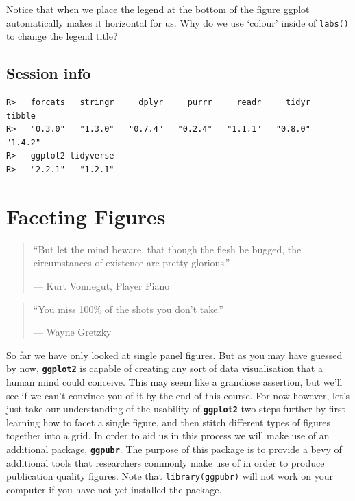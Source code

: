 \documentclass[]{book}
\newenvironment{Shaded}{\begin{snugshade}}{\end{snugshade}}
\newcommand{\KeywordTok}[1]{\textcolor[rgb]{0.13,0.29,0.53}{\textbf{#1}}}
\newcommand{\StringTok}[1]{\textcolor[rgb]{0.31,0.60,0.02}{#1}}
\newcommand{\OperatorTok}[1]{\textcolor[rgb]{0.81,0.36,0.00}{\textbf{#1}}}
\newcommand{\NormalTok}[1]{#1}
\theoremstyle{definition}
\theoremstyle{definition}
\theoremstyle{definition}
\theoremstyle{remark}
\begin{document}
Notice that when we place the legend at the bottom of the figure ggplot
automatically makes it horizontal for us. Why do we use `colour' inside
of \texttt{labs()} to change the legend title?

\section{Session info}\label{session-info-3}

\begin{Shaded}
\end{Shaded}

\begin{verbatim}
R>   forcats   stringr     dplyr     purrr     readr     tidyr    tibble 
R>   "0.3.0"   "1.3.0"   "0.7.4"   "0.2.4"   "1.1.1"   "0.8.0"   "1.4.2" 
R>   ggplot2 tidyverse 
R>   "2.2.1"   "1.2.1"
\end{verbatim}

\chapter{Faceting Figures}\label{faceting}

\begin{quote}
``But let the mind beware, that though the flesh be bugged, the
circumstances of existence are pretty glorious.''

--- Kurt Vonnegut, Player Piano
\end{quote}

\begin{quote}
``You miss 100\% of the shots you don't take.''

--- Wayne Gretzky
\end{quote}

So far we have only looked at single panel figures. But as you may have
guessed by now, \textbf{\texttt{ggplot2}} is capable of creating any
sort of data visualisation that a human mind could conceive. This may
seem like a grandiose assertion, but we'll see if we can't convince you
of it by the end of this course. For now however, let's just take our
understanding of the usability of \textbf{\texttt{ggplot2}} two steps
further by first learning how to facet a single figure, and then stitch
different types of figures together into a grid. In order to aid us in
this process we will make use of an additional package,
\textbf{\texttt{ggpubr}}. The purpose of this package is to provide a
bevy of additional tools that researchers commonly make use of in order
to produce publication quality figures. Note that
\texttt{library(ggpubr)} will not work on your computer if you have not
yet installed the package.
\end{document}
